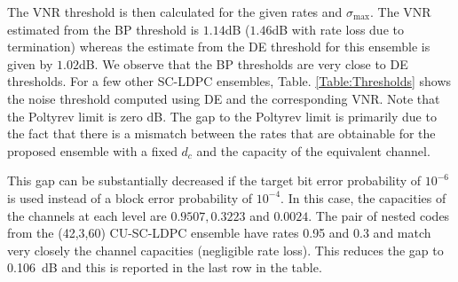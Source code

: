 \documentclass[conference]{IEEEtran}
\begin{document}
The VNR threshold is then calculated for the given rates and $\sigma_{\text{max}}$. The VNR estimated from the BP threshold is $1.14$dB ($1.46$dB with rate loss due to termination) whereas the estimate from the DE threshold for this ensemble is given by  $1.02$dB. We observe that the BP thresholds are very close to DE thresholds.
%
%
For a few other SC-LDPC ensembles, Table. \ref{Table:Thresholds} shows the noise threshold computed using DE and the corresponding VNR. Note that the Poltyrev limit is zero dB. The gap to the Poltyrev limit is primarily due to the fact that there is a mismatch between the rates that are obtainable for the proposed ensemble with a fixed $d_c$ and the capacity of the equivalent channel.
%

This gap can be substantially decreased if the target bit error probability of $10^{-6}$ is used instead of a block error probability of $10^{-4}$. In this case, the capacities of the channels at each level are $0.9507, 0.3223$ and $0.0024$. The pair of nested codes from the (42,3,60) CU-SC-LDPC ensemble have rates 0.95 and 0.3 and match very closely the channel capacities (negligible rate loss). This reduces the gap to 0.106~dB and this is reported in the last row in the table.
\end{document}
